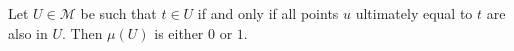 Let $U \in \mathcal{M}$ be such that $t \in U$ if and only if all points $u$ ultimately equal to $t$ are also in $U$. Then $\mu(U)$ is either $0$ or $1$.
